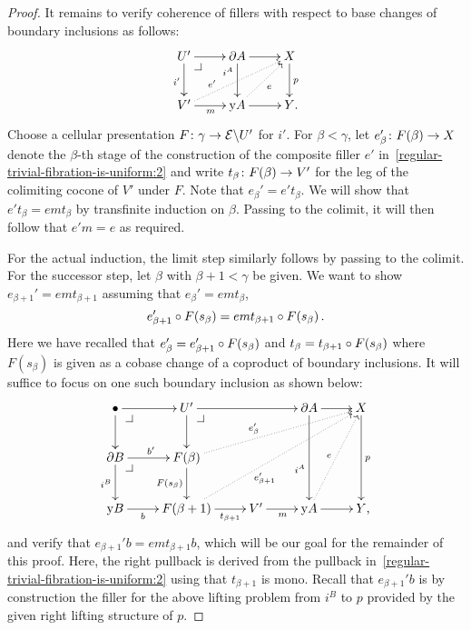 \documentclass[reqno,10pt,a4paper,oneside,draft]{amsart}
\begin{document}
\begin{proof}
It remains to verify coherence of fillers with respect to base changes of boundary inclusions as follows:
\begin{equation} \label{regular-trivial-fibration-is-uniform:2}
\begin{gathered}
\xymatrix{
  U'
  \ar[d]_{i'}
  \ar[r]
  \pullback{dr}
&
  \partial A
  \ar[d]_(0.3){i^A}
  \ar[r]
&
  X
  \ar[d]^{p}
\\
  V'
  \ar[r]_{m}
  \ar@{.>}[urr]^(0.3){e'}
&
  \yon A
  \ar[r]
  \ar@{.>}[ur]_{e}
&
  Y
\rlap{.}}
\end{gathered}
\end{equation}
Choose a cellular presentation $F \colon \gamma \to \mathcal{E} \backslash U'$ for $i'$.
For $\beta < \gamma$, let $e_{\beta}' \colon F(\beta) \to X$ denote the $\beta$-th stage of the construction of the composite filler $e'$ in~\eqref{regular-trivial-fibration-is-uniform:2} and write $t_{\beta} \colon F(\beta) \to V'$ for the leg of the colimiting cocone of $V'$ under $F$.
Note that $e_{\beta}' = e' t_{\beta}$.
We will show that $e' t_{\beta} = e m t_{\beta}$ by transfinite induction on $\beta$.
Passing to the colimit, it will then follow that $e' m = e$ as required.

For the actual induction, the limit step similarly follows by passing to the colimit.
For the successor step, let $\beta$ with $\beta + 1 < \gamma$ be given.
We want to show $e_{\beta+1}' = e m t_{\beta+1}$ assuming that $e_{\beta}' = e m t_{\beta}$, \ie
\begin{equation} \label{regular-trivial-fibration-is-uniform:ih}
  e_{\beta+1}' \mathbin{\circ} F(s_{\beta}) = e m t_{\beta+1} \mathbin{\circ} F(s_{\beta}) \, .
\end{equation}
Here we have recalled that $e_{\beta}' = e_{\beta+1}' \mathbin{\circ} F(s_{\beta})$ and $t_{\beta} = t_{\beta+1} \mathbin{\circ} F(s_{\beta})$ where $F(s_{\beta})$ is given as a cobase change of a coproduct of boundary inclusions.
It will suffice to focus on one such boundary inclusion as shown below:
\begin{equation} \label{regular-trivial-fibration-is-uniform:3}
\begin{gathered}
\xymatrix{
  \bullet
  \ar[r]
  \ar[d]
  \pullback{dr}
&
  U'
  \ar[rr]
  \ar[d]
  \pullback{dr}
&&
  \partial A
  \ar[r]
  \ar[dd]_(0.6){i^A}
&
  X
  \ar[dd]^{p}
\\
  \partial B
  \ar[r]^{b'}
  \ar[d]_{i^B}
  \pullback{dr}
&
  F(\beta)
  \ar[d]_{F(s_{\beta})}
  \ar@{.>}[urrr]^(0.4){e_{\beta}'}
\\
  \yon B
  \ar[r]_-{b}
&
  F(\beta+1)
  \ar[r]_-{t_{\beta+1}}
  \ar@{.>}[uurrr]_(0.4){e_{\beta+1}'}
&
  V'
  \ar[r]_{m}
&
  \yon A
  \ar[r]
  \ar@{.>}[uur]^{e}
&
  Y
\rlap{,}}
\end{gathered}
\end{equation}
and verify that $e_{\beta+1}' b = e m t_{\beta+1} b$, which will be our goal for the remainder of this proof.
Here, the right pullback is derived from the pullback in~\eqref{regular-trivial-fibration-is-uniform:2} using that $t_{\beta+1}$ is mono.
Recall that $e_{\beta+1}' b$ is by construction the filler for the above lifting problem from $i^B$ to $p$ provided by the given right lifting structure of $p$.


\end{proof}
\end{document}
